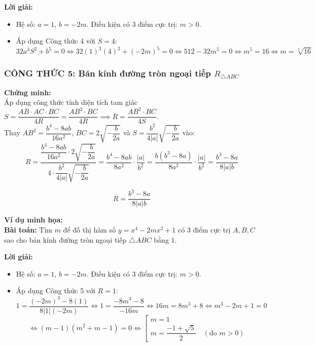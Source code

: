 \begin{itemize}
\noindent \textbf{Lời giải:}
\begin{itemize}
    \item Hệ số: $a = 1$, $b = -2m$. Điều kiện có 3 điểm cực trị: $m > 0$.
    \item Áp dụng Công thức 4 với $S = 4$:
    \[
    32 a^3 S^2 + b^5 = 0 \iff 32(1)^3(4)^2 + (-2m)^5 = 0 \iff 512 - 32m^5 = 0 \iff m^5 = 16 \iff m = \sqrt[5]{16}
    \]
\end{itemize}

\vspace{0.5cm}

\subsubsection{CÔNG THỨC 5: Bán kính đường tròn ngoại tiếp $R_{\triangle ABC}$}

\noindent \textbf{Chứng minh:} \\
Áp dụng công thức tính diện tích tam giác $S = \dfrac{AB \cdot AC \cdot BC}{4R} = \dfrac{AB^2 \cdot BC}{4R} \implies R = \dfrac{AB^2 \cdot BC}{4S}$. \\
Thay $AB^2 = \dfrac{b^4 - 8ab}{16a^2}$, $BC = 2\sqrt{-\dfrac{b}{2a}}$ và $S = \dfrac{b^2}{4|a|}\sqrt{-\dfrac{b}{2a}}$ vào:
\[
R = \frac{\dfrac{b^4 - 8ab}{16a^2} \cdot 2\sqrt{-\dfrac{b}{2a}}}{4 \cdot \dfrac{b^2}{4|a|}\sqrt{-\dfrac{b}{2a}}} = \frac{b^4 - 8ab}{8a^2} \cdot \frac{|a|}{b^2} = \frac{b(b^3 - 8a)}{8a^2} \cdot \frac{|a|}{b^2} = \frac{b^3 - 8a}{8|a|b}
\]

\begin{tcolorbox}[title=CÔNG THỨC GIẢI NHANH 5]
\[
R = \frac{b^3 - 8a}{8|a|b}
\]
\end{tcolorbox}

\noindent \textbf{Ví dụ minh họa:} \\
\textbf{Bài toán:} Tìm $m$ để đồ thị hàm số $y = x^4 - 2mx^2 + 1$ có 3 điểm cực trị $A, B, C$ sao cho bán kính đường tròn ngoại tiếp $\triangle ABC$ bằng $1$.

\noindent \textbf{Lời giải:}
\begin{itemize}
    \item Hệ số: $a = 1$, $b = -2m$. Điều kiện có 3 điểm cực trị: $m > 0$.
    \item Áp dụng Công thức 5 với $R = 1$:
    \[
    1 = \frac{(-2m)^3 - 8(1)}{8|1|(-2m)} \iff 1 = \frac{-8m^3 - 8}{-16m} \iff 16m = 8m^3 + 8 \iff m^3 - 2m + 1 = 0
    \]
    \[
    \iff (m - 1)(m^2 + m - 1) = 0 \iff \left[ \begin{array}{l} m = 1 \\ m = \dfrac{-1 + \sqrt{5}}{2} \quad (\text{do } m > 0) \end{array} \right.
    \]
\end{itemize}

\end{itemize}
